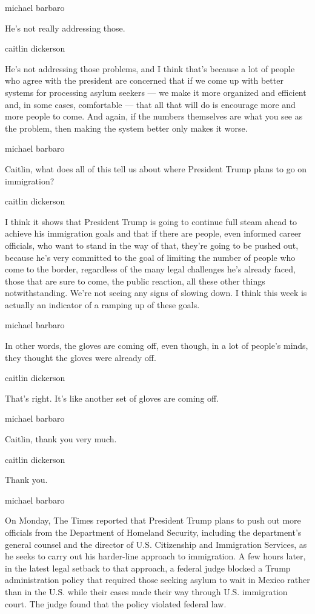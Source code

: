 michael barbaro

He's not really addressing those.

caitlin dickerson

He's not addressing those problems, and I think that's because a lot of
people who agree with the president are concerned that if we come up
with better systems for processing asylum seekers --- we make it more
organized and efficient and, in some cases, comfortable --- that all
that will do is encourage more and more people to come. And again, if
the numbers themselves are what you see as the problem, then making the
system better only makes it worse.

michael barbaro

Caitlin, what does all of this tell us about where President Trump plans
to go on immigration?

caitlin dickerson

I think it shows that President Trump is going to continue full steam
ahead to achieve his immigration goals and that if there are people,
even informed career officials, who want to stand in the way of that,
they're going to be pushed out, because he's very committed to the goal
of limiting the number of people who come to the border, regardless of
the many legal challenges he's already faced, those that are sure to
come, the public reaction, all these other things notwithstanding. We're
not seeing any signs of slowing down. I think this week is actually an
indicator of a ramping up of these goals.

michael barbaro

In other words, the gloves are coming off, even though, in a lot of
people's minds, they thought the gloves were already off.

caitlin dickerson

That's right. It's like another set of gloves are coming off.

michael barbaro

Caitlin, thank you very much.

caitlin dickerson

Thank you.

michael barbaro

On Monday, The Times reported that President Trump plans to push out
more officials from the Department of Homeland Security, including the
department's general counsel and the director of U.S. Citizenship and
Immigration Services, as he seeks to carry out his harder-line approach
to immigration. A few hours later, in the latest legal setback to that
approach, a federal judge blocked a Trump administration policy that
required those seeking asylum to wait in Mexico rather than in the U.S.
while their cases made their way through U.S. immigration court. The
judge found that the policy violated federal law.

